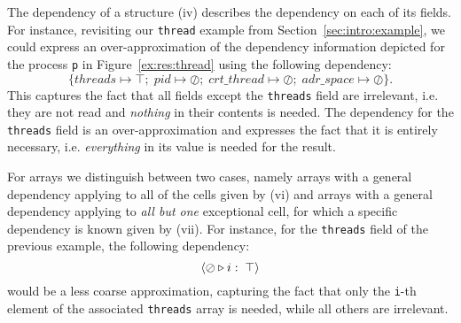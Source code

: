 \documentclass[11pt]{article}
\newcommand{\snumber}[1]{\textrm{{\scriptsize(#1)}}}
\newcommand{\disp}[1]{\lstinline&#1&}
\begin{document}
The dependency of a structure {\snumber{iv}} describes the dependency on each of 
its fields. %
For instance, revisiting our \disp{thread} example from 
Section~\ref{sec:intro:example}, we could express an over-approximation of the 
dependency information depicted for the process \disp{p} in 
Figure~\ref{ex:res:thread} using the following dependency: 
%
\[
\{\mathit{threads} \mapsto \top; \; \mathit{pid} \mapsto \oslash; \; 
\mathit{crt\_thread} \mapsto \oslash; \; \mathit{adr\_space} \mapsto \oslash \}.\]
%
This captures the fact that all fields except the \disp{threads} field are 
irrelevant, i.e. they are not read and \emph{nothing} in their contents is 
needed. The dependency for the \disp{threads} field is an over-approximation
and expresses the fact that it is entirely necessary, i.e. \emph{everything} in 
its value is needed for the result.   

For arrays we distinguish between two cases, namely arrays with a general 
dependency applying to all of the cells {given by \snumber{vi}} and arrays with a 
general dependency applying to \emph{all but one} exceptional cell, for which a specific 
dependency is known {given by \snumber{vii}}. %
For instance, for the \disp{threads} field of the previous example, the 
following dependency:
%
\[
\langle \oslash \triangleright i: \; \top \rangle
\]
%
would be a less coarse approximation, capturing the fact that only the \disp{i}-th 
element of the associated \disp{threads} array is needed, while all others are 
irrelevant.
\end{document}
